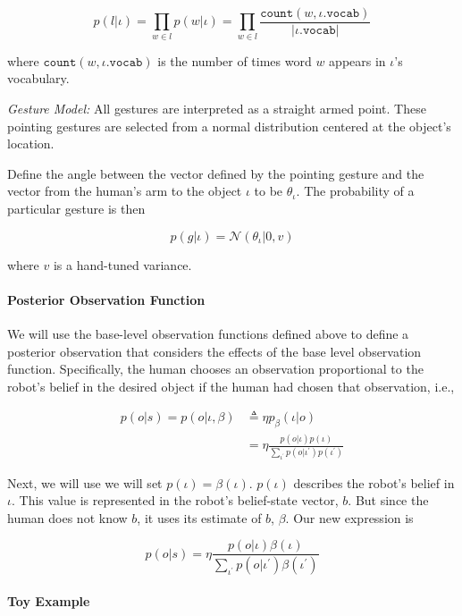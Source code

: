 \documentclass{article}
\begin{document}
\begin{equation}
	p(l|\iota) = \prod_{w \in l} p(w|\iota) = \prod_{w\in l} \frac{\texttt{count}(w, \iota.\texttt{vocab})}{|\iota.\texttt{vocab}|}
\end{equation}

where $\texttt{count}(w, \iota.\texttt{vocab})$ is the number of times word $w$ appears in $\iota$'s vocabulary. 

\noindent\textit{Gesture Model:} All gestures are interpreted as a straight armed point. These pointing gestures are selected from a normal distribution centered at the object's location. 

Define the angle between the vector defined by the pointing gesture and the vector from the human's arm to the object $\iota$ to be $\theta_\iota$. The probability of a particular gesture is then

\begin{equation}
p(g|\iota) = \mathcal{N}(\theta_\iota | 0, v)
\end{equation}

where $v$ is a hand-tuned variance. 

\paragraph{Posterior Observation Function}

We will use the base-level observation functions defined above to define a posterior observation that considers the effects of the base level observation function. Specifically, the human chooses an observation proportional to the robot's belief in the desired object if the human had chosen that observation, i.e., 

\begin{align}
p(o|s) = p(o|\iota, \beta) &\triangleq \eta p_\beta(\iota|o) \\
&= \eta \frac{p(o|\iota) p(\iota)}{\sum_{\iota^\prime} p(o|\iota^\prime)p(\iota^\prime)} 
\end{align}

Next, we will use we will set $p(\iota) = \beta(\iota)$. $p(\iota)$ describes the robot's belief in $\iota$. This value is represented in the robot's belief-state vector, $b$. But since the human does not know $b$, it uses its estimate of $b$, $\beta$. Our new expression is 


$$p(o|s) = \eta \frac{p(o|\iota) \beta(\iota)}{\sum_{\iota^\prime} p(o|\iota^\prime)\beta(\iota^\prime)} $$


\paragraph{Toy Example} 
\end{document}

